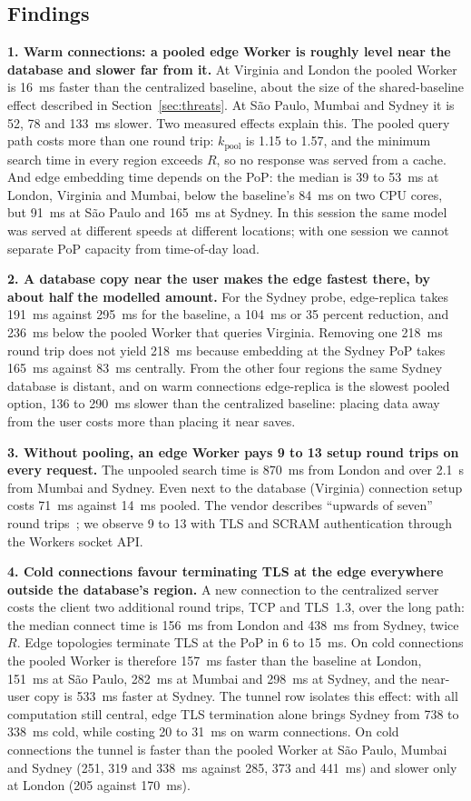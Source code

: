 \documentclass[conference]{IEEEtran}
\begin{document}
\subsection{Findings}\label{sec:findings}
\textbf{1. Warm connections: a pooled edge Worker is roughly level near the database and slower
far from it.} At Virginia and London the pooled Worker is 16~ms faster than the centralized
baseline, about the size of the shared-baseline effect described in Section~\ref{sec:threats}. At S\~ao Paulo, Mumbai and Sydney it is 52, 78 and 133~ms slower. Two measured effects
explain this. The pooled query path costs more than one round trip: $k_{\mathrm{pool}}$ is 1.15 to
1.57, and the minimum search time in every region exceeds $R$, so no response was served from a
cache. And edge embedding time depends on the PoP: the median is 39 to 53~ms at London, Virginia
and Mumbai, below the baseline's 84~ms on two CPU cores, but 91~ms at S\~ao Paulo and 165~ms at
Sydney. In this session the same model was served at different speeds at different locations;
with one session we cannot separate PoP capacity from time-of-day load.

\textbf{2. A database copy near the user makes the edge fastest there, by about half the modelled
amount.} For the Sydney probe, edge-replica takes 191~ms against 295~ms for the baseline, a 104~ms
or 35 percent reduction, and 236~ms below the pooled Worker that queries Virginia. Removing one
218~ms round trip does not yield 218~ms because embedding at the Sydney PoP takes 165~ms against
83~ms centrally. From the other four regions the same Sydney database is distant, and on warm
connections edge-replica is the slowest pooled option, 136 to 290~ms slower than the centralized
baseline: placing data away from the user costs more than placing it near saves.

\textbf{3. Without pooling, an edge Worker pays 9 to 13 setup round trips on every request.} The
unpooled search time is 870~ms from London and over 2.1~s from Mumbai and Sydney. Even next to the
database (Virginia) connection setup costs 71~ms against 14~ms pooled. The vendor describes
``upwards of seven'' round trips~\cite{hyperdrive2023}; we observe 9 to 13 with TLS and SCRAM
authentication through the Workers socket API.

\textbf{4. Cold connections favour terminating TLS at the edge everywhere outside the
database's region.} A new connection to the centralized server costs the client two additional round trips,
TCP and TLS~1.3, over the long path: the median connect time is 156~ms from London and 438~ms from
Sydney, twice $R$. Edge topologies terminate TLS at the PoP in 6 to 15~ms. On cold connections the
pooled Worker is therefore 157~ms faster than the baseline at London, 151~ms at S\~ao Paulo,
282~ms at Mumbai and 298~ms at Sydney, and the near-user copy is 533~ms faster at Sydney. The
tunnel row isolates this effect: with all computation still central, edge TLS termination alone
brings Sydney from 738 to 338~ms cold, while costing 20 to 31~ms on warm connections. On cold
connections the tunnel is faster than the pooled Worker at S\~ao Paulo, Mumbai and Sydney (251,
319 and 338~ms against 285, 373 and 441~ms) and slower only at London (205 against 170~ms).
\end{document}
